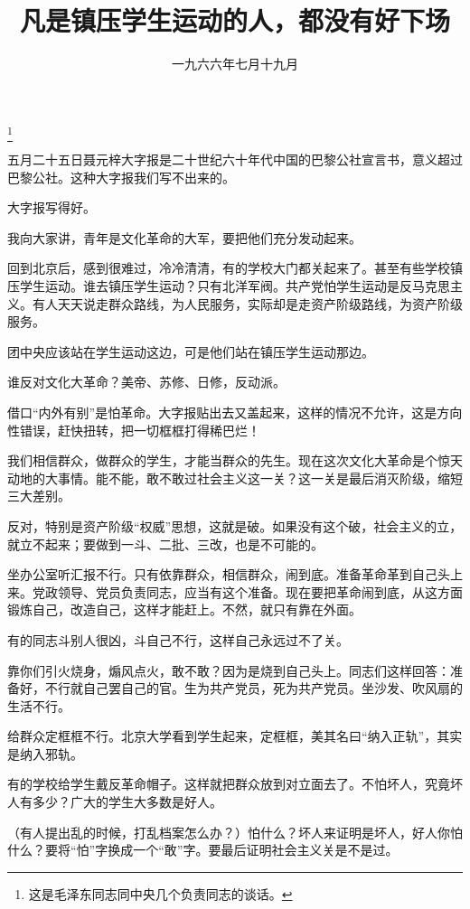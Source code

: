 
\title{凡是镇压学生运动的人，都没有好下场}
\date{一九六六年七月十九月}
\thanks{这是毛泽东同志同中央几个负责同志的谈话。}
\maketitle


五月二十五日聂元梓大字报是二十世纪六十年代中国的巴黎公社宣言书，意义超过巴黎公社。这种大字报我们写不出来的。

大字报写得好。

我向大家讲，青年是文化革命的大军，要把他们充分发动起来。

回到北京后，感到很难过，冷冷清清，有的学校大门都关起来了。甚至有些学校镇压学生运动。谁去镇压学生运动？只有北洋军阀。共产党怕学生运动是反马克思主义。有人天天说走群众路线，为人民服务，实际却是走资产阶级路线，为资产阶级服务。

团中央应该站在学生运动这边，可是他们站在镇压学生运动那边。

谁反对文化大革命？美帝、苏修、日修，反动派。

借口“内外有别”是怕革命。大字报贴出去又盖起来，这样的情况不允许，这是方向性错误，赶快扭转，把一切框框打得稀巴烂！

我们相信群众，做群众的学生，才能当群众的先生。现在这次文化大革命是个惊天动地的大事情。能不能，敢不敢过社会主义这一关？这一关是最后消灭阶级，缩短三大差别。

反对，特别是资产阶级“权威”思想，这就是破。如果没有这个破，社会主义的立，就立不起来；要做到一斗、二批、三改，也是不可能的。

坐办公室听汇报不行。只有依靠群众，相信群众，闹到底。准备革命革到自己头上来。党政领导、党员负责同志，应当有这个准备。现在要把革命闹到底，从这方面锻炼自己，改造自己，这样才能赶上。不然，就只有靠在外面。

有的同志斗别人很凶，斗自己不行，这样自己永远过不了关。

靠你们引火烧身，煽风点火，敢不敢？因为是烧到自己头上。同志们这样回答：准备好，不行就自己罢自己的官。生为共产党员，死为共产党员。坐沙发、吹风扇的生活不行。

给群众定框框不行。北京大学看到学生起来，定框框，美其名曰“纳入正轨”，其实是纳入邪轨。

有的学校给学生戴反革命帽子。这样就把群众放到对立面去了。不怕坏人，究竟坏人有多少？广大的学生大多数是好人。

（有人提出乱的时候，打乱档案怎么办？）怕什么？坏人来证明是坏人，好人你怕什么？要将“怕”字换成一个“敢”字。要最后证明社会主义关是不是过。

